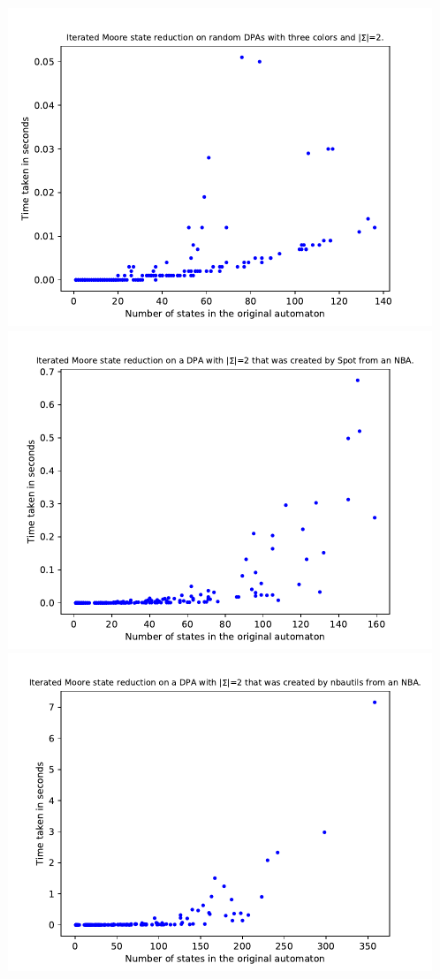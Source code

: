\begin{figure}
	\centering
	\begin{minipage}{0.49\textwidth}
		\includegraphics[page=4,height=.3\textheight]{../data/analysis/iterated_moore/gendet_ap1.pdf} 
		\includegraphics[page=4,height=.3\textheight]{../data/analysis/iterated_moore/detspot_ap1.pdf} 
		\includegraphics[page=4,height=.3\textheight]{../data/analysis/iterated_moore/detnbaut_ap1.pdf} 

\end{minipage}
\end{figure}
